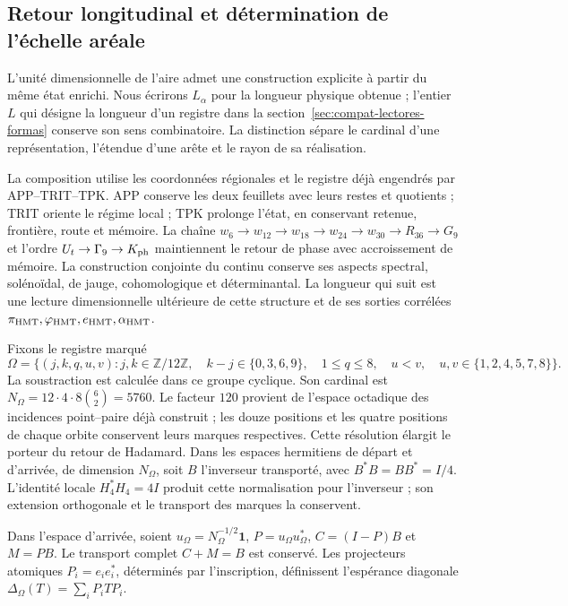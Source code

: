 \subsection{Retour longitudinal et détermination de l’échelle aréale}
\label{rev5:longitud}

L'unité dimensionnelle de l'aire admet une construction explicite à partir du même état enrichi. Nous écrirons \(L_\alpha\) pour la longueur physique obtenue ; l'entier \(L\) qui désigne la longueur d'un registre dans la section~\ref{sec:compat-lectores-formas} conserve son sens combinatoire. La distinction sépare le cardinal d'une représentation, l'étendue d'une arête et le rayon de sa réalisation.

La composition utilise les coordonnées régionales et le registre déjà
engendrés par APP--TRIT--TPK. APP conserve les deux feuillets avec leurs restes
et quotients ; TRIT oriente le régime local ; TPK prolonge l’état,
en conservant retenue, frontière, route et mémoire. La chaîne
\(w_6\to w_{12}\to w_{18}\to w_{24}\to w_{30}\to R_{36}\to G_9\)
et l’ordre \(U_t\to\Gamma_9\to K_{\rm ph}\) maintiennent le
retour de phase avec accroissement de mémoire. La construction conjointe
du continu conserve ses aspects spectral, solénoïdal, de jauge,
cohomologique et déterminantal. La longueur qui suit est une lecture
dimensionnelle ultérieure de cette structure et de ses sorties corrélées
\(\pi_{\rm HMT},\varphi_{\rm HMT},e_{\rm HMT},\alpha_{\rm HMT}\).

Fixons le registre marqué
\[
 \Omega=\{(j,k,q,u,v):j,k\in\mathbb Z/12\mathbb Z,\quad
 k-j\in\{0,3,6,9\},\quad1\le q\le8,\quad
 u<v,\quad u,v\in\{1,2,4,5,7,8\}\}.
\]
La soustraction est calculée dans ce groupe cyclique. Son cardinal est
\(N_\Omega=12\cdot4\cdot8\binom62=5760\).
Le facteur \(120\) provient de l’espace octadique des incidences
point--paire déjà construit ; les douze positions et les quatre
positions de chaque orbite conservent leurs marques respectives. Cette
résolution élargit le porteur du retour de Hadamard. Dans les espaces
hermitiens de départ et d’arrivée, de dimension \(N_\Omega\), soit
\(B\) l’inverseur transporté, avec
\(B^*B=BB^*=I/4\). L’identité locale
\(H_4^*H_4=4I\) produit cette normalisation pour l’inverseur ;
son extension orthogonale et le transport des marques la conservent.

Dans l'espace d'arrivée, soient \(u_\Omega=N_\Omega^{-1/2}\mathbf1\), \(P=u_\Omega u_\Omega^*\), \(C=(I-P)B\) et \(M=PB\). Le transport complet \(C+M=B\) est conservé. Les projecteurs atomiques \(P_i=e_ie_i^*\), déterminés par l'inscription, définissent l'espérance diagonale \(\Delta_\Omega(T)=\sum_iP_iTP_i\).

